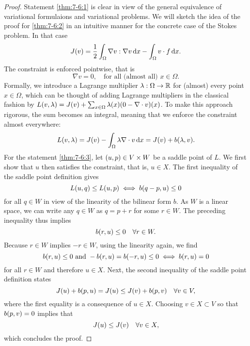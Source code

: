 \begin{proof}
	Statement \ref{thm:7-6:1} is clear in view of the general equivalence of variational formulaions and variational problems. We will sketch the idea of the proof for \ref{thm:7-6:2} in an intuitive manner for the concrete case of the Stokes problem.
	In that case
	\[
		J\parentheses*{v} = \frac{1}{2}\int_\Omega \nabla v : \nabla v\d x - \int_\Omega v \cdot f\d x.
	\]
	The constraint is enforced pointwise, that is
	\[
		\nabla v = 0, \quad \text{for all (almost all) }x \in \Omega.
	\]
	Formally, we introduce a Lagrange multiplier \(\lambda: \Omega \to \R\) for (almost) every point \(x \in \Omega\), which can be thought of adding Lagrange multipliers in the classical fashion by \(L\parentheses*{v, \lambda} = J\parentheses*{v} + \sum_{x \in \Omega}\lambda\parentheses*{x}\parentheses*{0 - \nabla \cdot v}\parentheses*{x}\).
	To make this approach rigorous, the sum becomes an integral, meaning that we enforce the constraint almost everywhere:
	\[
		L\parentheses*{v, \lambda} = J\parentheses*{v} - \int_\Omega \lambda\nabla \cdot v\d x = J\parentheses*{v} + b\parentheses*{\lambda, v}.
	\]
	For the statement \ref{thm:7-6:3}, let \(\parentheses*{u, p} \in V \times W\) be a saddle point of \(L\).
	We first show that \(u\) then satisfies the constraint, that is, \(u \in X\).
	The first inequality of the saddle point definition gives
	\[
		L\parentheses*{u, q} \le L\parentheses*{u, p} \iff b\parentheses*{q - p, u} \le 0
	\]
	for all \(q \in W\) in view of the linearity of the bilinear form \(b\).
	As \(W\) is a linear space, we can write any \(q \in W\) as \(q = p + r\) for some \(r \in W\).
	The preceding inequality thus implies
	\[
		b\parentheses*{r, u} \le 0 \quad \forall r \in W.
	\]
	Because \(r \in W\) implies \(-r \in W\), using the linearity again, we find
	\[
		b\parentheses*{r, u} \le 0\text{ and }-b\parentheses*{r, u} = b\parentheses*{-r, u} \le 0 \iff b\parentheses*{r, u} = 0
	\]
	for all \(r \in W\) and therefore \(u \in X\).
	Next, the second inequality of the saddle point definition states
	\[
		J\parentheses*{u} + b\parentheses*{p, u} = J\parentheses*{u} \le J\parentheses*{v} + b\parentheses*{p, v} \quad \forall v \in V,
	\]
	where the first equality is a consequence of \(u \in X\).
	Choosing \(v \in X \subset V\) so that \(b\parentheses*{p, v} = 0\) implies that
	\[
		J\parentheses*{u} \le J\parentheses*{v} \quad \forall v \in X,
	\]
	which concludes the proof.
\end{proof}


